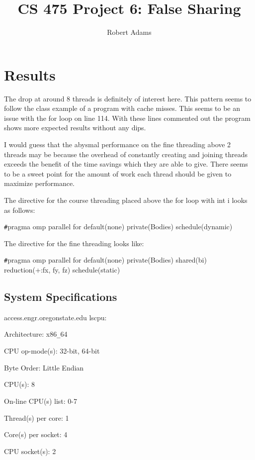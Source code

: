 \documentclass[letterpaper,10pt]{article} %
\begin{document}
\title{CS 475 Project 6: False Sharing} 
\author{Robert Adams}
\maketitle



\section{Results}

The drop at around 8 threads is definitely of interest here.
This pattern seems to follow the class example of a program with cache misses.
This seems to be an issue with the for loop on line 114. With these
lines commented out the program shows more expected results without any dips. 


I would guess that the abysmal performance on the fine threading
above 2 threads may be because the overhead of constantly creating 
and joining threads exceeds the benefit of the time savings which they 
are able to give. There seems to be a sweet point for the amount of
work each thread should be given to maximize performance. 


The directive for the course threading placed above the for loop with int i looks as follows:

\verb|#|pragma omp parallel for default(none) private(Bodies) schedule(dynamic) 

The directive for the fine threading looks like:

\verb|#|pragma omp parallel for default(none) private(Bodies) shared(bi) reduction(+:fx, fy, fz) schedule(static)


\subsection{System Specifications}

access.engr.oregonstate.edu   lscpu:

Architecture:          x86\verb|_|64

CPU op-mode(s):        32-bit, 64-bit

Byte Order:            Little Endian

CPU(s):                8

On-line CPU(s) list:   0-7

Thread(s) per core:    1

Core(s) per socket:    4

CPU socket(s):         2
\end{document}
